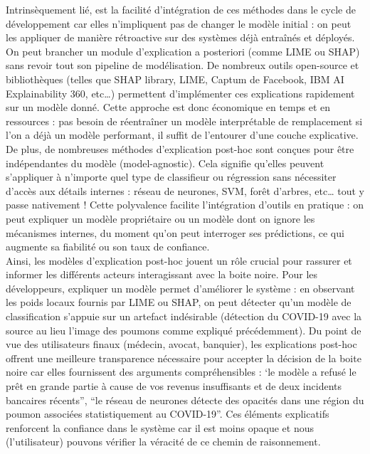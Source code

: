 \documentclass{article}
\begin{document}
    Intrinsèquement lié, est la facilité d’intégration de ces méthodes dans le cycle de développement car elles n’impliquent pas de changer le modèle initial : on peut les appliquer de manière rétroactive sur des systèmes déjà entraînés et déployés. On peut brancher un module d’explication a posteriori (comme LIME ou SHAP) sans revoir tout son pipeline de modélisation. De nombreux outils open-source et bibliothèques (telles que SHAP library, LIME, Captum de Facebook, IBM AI Explainability 360, etc…) permettent d’implémenter ces explications rapidement sur un modèle donné. Cette approche est donc économique en temps et en ressources : pas besoin de réentraîner un modèle interprétable de remplacement si l’on a déjà un modèle performant, il suffit de l’entourer d’une couche explicative.\\
    
    De plus, de nombreuses méthodes d’explication post-hoc sont conçues pour être indépendantes du modèle (model-agnostic). Cela signifie qu’elles peuvent s’appliquer à n’importe quel type de classifieur ou régression sans nécessiter d’accès aux détails internes : réseau de neurones, SVM, forêt d’arbres, etc… tout y passe nativement ! Cette polyvalence facilite l’intégration d’outils en pratique : on peut expliquer un modèle propriétaire ou un modèle dont on ignore les mécanismes internes, du moment qu’on peut interroger ses prédictions, ce qui augmente sa fiabilité ou son taux de confiance.\\
    
    Ainsi, les modèles d’explication post-hoc jouent un rôle crucial pour rassurer et informer les différents acteurs interagissant avec la boite noire. Pour les développeurs, expliquer un modèle permet d’améliorer le système : en observant les poids locaux fournis par LIME ou SHAP, on peut détecter qu’un modèle de classification s’appuie sur un artefact indésirable (détection du COVID-19 avec la source au lieu l’image des poumons comme expliqué précédemment). Du point de vue des utilisateurs finaux (médecin, avocat, banquier), les explications post-hoc offrent une meilleure transparence nécessaire pour accepter la décision de la boite noire car elles fournissent des arguments compréhensibles : ‘le modèle a refusé le prêt en grande partie à cause de vos revenus insuffisants et de deux incidents bancaires récents”, “le réseau de neurones détecte des opacités dans une région du poumon associées statistiquement au COVID-19”. Ces éléments explicatifs renforcent la confiance dans le système car il est moins opaque et nous (l’utilisateur) pouvons vérifier la véracité de ce chemin de raisonnement.
\end{document}

